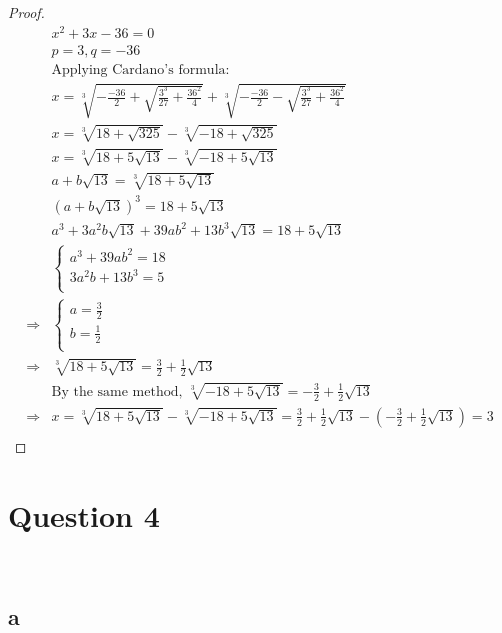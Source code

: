 \documentclass{article}
\begin{document}
\begin{proof}
    \begin{align*}
        &x^2+3x-36=0\\
        &p=3,q=-36\\
        &\text{Applying Cardano's formula}:\\
        &x=\sqrt[3]{-\frac{-36}{2}+\sqrt{\frac{3^3}{27}+\frac{36^2}{4}}}+\sqrt[3]{-\frac{-36}{2}-\sqrt{\frac{3^3}{27}+\frac{36^2}{4}}}\\
        &x=\sqrt[3]{18+\sqrt{325}}-\sqrt[3]{-18+\sqrt{325}}\\
        &x=\sqrt[3]{18+5\sqrt{13}}-\sqrt[3]{-18+5\sqrt{13}}\\
        &a+b\sqrt{13}=\sqrt[3]{18+5\sqrt{13}}\\
        &(a+b\sqrt{13})^3=18+5\sqrt{13}\\
        &a^3+3a^2b\sqrt{13}+39ab^2+13b^3\sqrt{13}=18+5\sqrt{13}\\
        &\begin{cases}
            a^3+39ab^2=18\\
            3a^2b+13b^3=5\\
        \end{cases}\\
        \Rightarrow&\begin{cases}
            a=\frac{3}{2}\\
            b=\frac{1}{2}\\
        \end{cases}\\
        \Rightarrow&\sqrt[3]{18+5\sqrt{13}}=\frac{3}{2}+\frac{1}{2}\sqrt{13}\\
        &\text{By the same method, }\sqrt[3]{-18+5\sqrt{13}}=-\frac{3}{2}+\frac{1}{2}\sqrt{13}\\
        \Rightarrow&x=\sqrt[3]{18+5\sqrt{13}}-\sqrt[3]{-18+5\sqrt{13}}=\frac{3}{2}+\frac{1}{2}\sqrt{13}-(-\frac{3}{2}+\frac{1}{2}\sqrt{13})=3\\
    \end{align*}
\end{proof}

\newpage

\section*{Question 4}

~

\subsection*{a}
\end{document}
